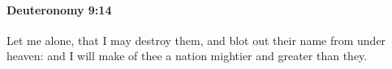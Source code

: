 
		\paragraph{Deuteronomy 9:14} %
			\label{DEUTERONOMY-9-14}

			Let me alone, that I may destroy them, and blot out their name from under heaven: and I will make of thee a nation mightier and greater than they.


